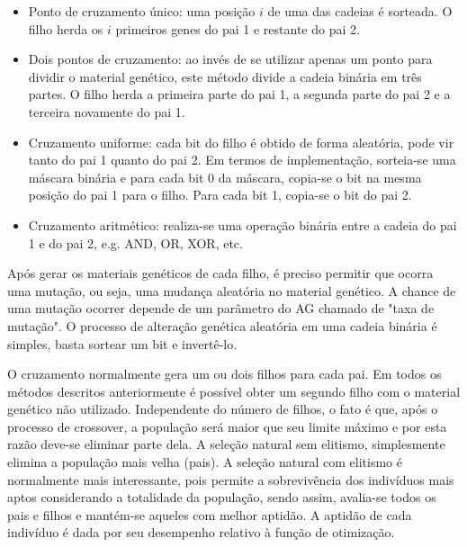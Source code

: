 \begin{itemize}  
	\item Ponto de cruzamento único: uma posição $i$ de uma das cadeias é sorteada. O filho herda os $i$ primeiros genes do pai 1 e restante do pai 2.
	\item Dois pontos de cruzamento: ao invés de se utilizar apenas um ponto para dividir o material genético, este método divide a cadeia binária em três partes. O filho herda a primeira parte do pai 1, a segunda parte do pai 2 e a terceira novamente do pai 1.
	\item Cruzamento uniforme: cada bit do filho é obtido de forma aleatória, pode vir tanto do pai 1 quanto do pai 2. Em termos de implementação, sorteia-se uma máscara binária e para cada bit 0 da máscara, copia-se o bit na mesma posição do pai 1 para o filho. Para cada bit 1, copia-se o bit do pai 2.
	\item Cruzamento aritmético: realiza-se uma operação binária entre a cadeia do pai 1 e do pai 2, e.g. AND, OR, XOR, etc.
\end{itemize}

Após gerar os materiais genéticos de cada filho, é preciso permitir que ocorra uma mutação, ou seja, uma mudança aleatória no material genético. A chance de uma mutação ocorrer depende de um parâmetro do AG chamado de "taxa de mutação". O processo de alteração genética aleatória em uma cadeia binária é simples, basta sortear um bit e invertê-lo.

O cruzamento normalmente gera um ou dois filhos para cada pai. Em todos os métodos descritos anteriormente é possível obter um segundo filho com o material genético não utilizado. Independente do número de filhos, o fato é que, após o processo de crossover, a população será maior que seu limite máximo e por esta razão deve-se eliminar parte dela. A seleção natural sem elitismo, simplesmente elimina a população mais velha (pais). A seleção natural com elitismo é normalmente mais interessante, pois permite a sobrevivência dos indivíduos mais aptos considerando a totalidade da população, sendo assim, avalia-se todos os pais e filhos e mantém-se aqueles com melhor aptidão. A aptidão de cada indivíduo é dada por seu desempenho relativo à função de otimização.

